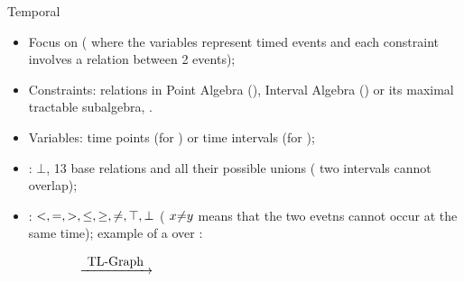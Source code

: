 \begin{frame}{Temporal \CSPNames{}}
    \begin{itemize}
        \item Focus on \TCSPNames{} (\ie{} \CSPNames{} where the variables represent timed events and each constraint involves a relation between 2 events);
        \item Constraints: relations in Point Algebra (\PAName{}), Interval Algebra (\IAName{}) or its maximal tractable subalgebra,  \OrdHornName{}.
        \item Variables: time points (for \PAName{}) or time intervals (for \IAName{});
        \item \IAName{}: $\bot$, 13 base relations and all their possible unions (\eg{} two intervals cannot overlap);
        \item \PAName{}: $<, =, >, \leq, \geq, \noteq{}, \top, \bot$ (\eg{} $x \noteq{} y$ means that the two evetns cannot occur at the same time); example of a \TCSPName{} over \PAName{}:
	\end{itemize}

    \begin{figure}
        \centering
        \begin{subfigure}{0.44\textwidth}
            \centering
        \end{subfigure}\hfill%
        \begin{subfigure}{0.1\textwidth}
            \centering
            $\xrightarrow{\mbox{ TL-Graph {}}}$
        \end{subfigure}\hfill%
        \begin{subfigure}{0.44\textwidth}
            \centering
\end{subfigure}
\end{figure}
\end{frame}
